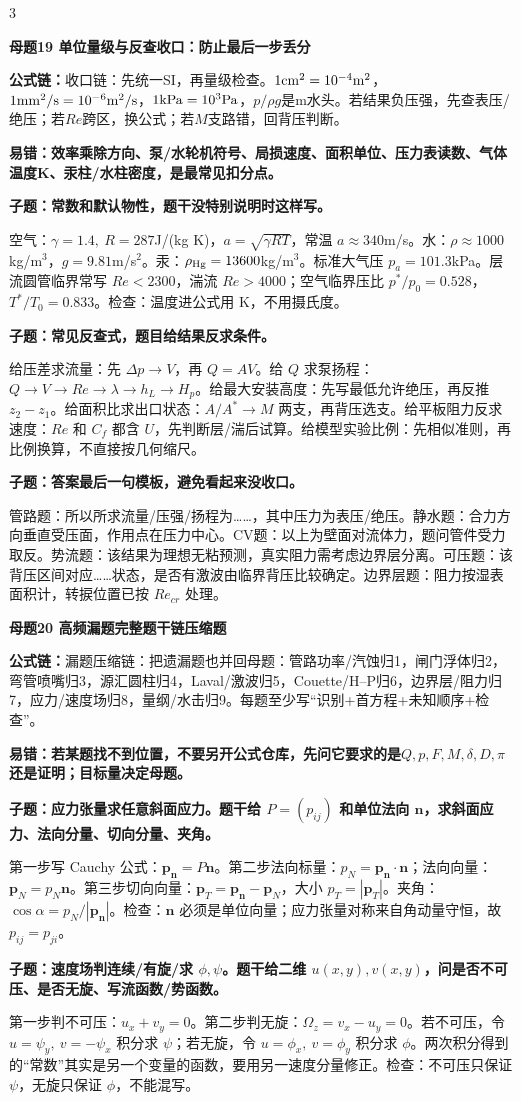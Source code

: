\documentclass[a4paper]{article}
\newcommand{\mt}[1]{\vspace{0.12pt}\colorbox{M}{\parbox{\dimexpr\linewidth-2\fboxsep}{\color{white}\bfseries #1}}\par}
\newcommand{\qt}[1]{\vspace{0.04pt}\colorbox{Q}{\parbox{\dimexpr\linewidth-2\fboxsep}{\color{white}\bfseries #1}}\par}
\newcommand{\ans}[1]{\colorbox{G}{\parbox{\dimexpr\linewidth-2\fboxsep}{#1}}\par}
\newcommand{\warn}[1]{\colorbox{Y}{\parbox{\dimexpr\linewidth-2\fboxsep}{\color{E}\bfseries #1}}\par}
\newcommand{\form}[1]{{\color{M}\bfseries 公式链：}#1\par}
\begin{document}
\begin{multicols}{3}
\mt{母题19 单位量级与反查收口：防止最后一步丢分}
\form{收口链：先统一SI，再量级检查。$1{\rm cm^2}=10^{-4}{\rm m^2}$，$1{\rm mm^2/s}=10^{-6}{\rm m^2/s}$，$1{\rm kPa}=10^3{\rm Pa}$，$p/\rho g$是m水头。若结果负压强，先查表压/绝压；若$Re$跨区，换公式；若$M$支路错，回背压判断。}
\warn{易错：效率乘除方向、泵/水轮机符号、局损速度、面积单位、压力表读数、气体温度K、汞柱/水柱密度，是最常见扣分点。}
\qt{子题：常数和默认物性，题干没特别说明时这样写。}
\ans{空气：$\gamma=1.4,\ R=287$J/(kg K)，$a=\sqrt{\gamma RT}$，常温 $a\approx340$m/s。水：$\rho\approx1000$kg/m$^3$，$g=9.81$m/s$^2$。汞：$\rho_{\rm Hg}=13600$kg/m$^3$。标准大气压 $p_a=101.3$kPa。层流圆管临界常写 $Re<2300$，湍流 $Re>4000$；空气临界压比 $p^*/p_0=0.528$，$T^*/T_0=0.833$。检查：温度进公式用 K，不用摄氏度。}
\qt{子题：常见反查式，题目给结果反求条件。}
\ans{给压差求流量：先 $\Delta p\to V$，再 $Q=AV$。给 $Q$ 求泵扬程：$Q\to V\to Re\to\lambda\to h_L\to H_p$。给最大安装高度：先写最低允许绝压，再反推 $z_2-z_1$。给面积比求出口状态：$A/A^*\to M$ 两支，再背压选支。给平板阻力反求速度：$Re$ 和 $C_f$ 都含 $U$，先判断层/湍后试算。给模型实验比例：先相似准则，再比例换算，不直接按几何缩尺。}
\qt{子题：答案最后一句模板，避免看起来没收口。}
\ans{管路题：所以所求流量/压强/扬程为……，其中压力为表压/绝压。静水题：合力方向垂直受压面，作用点在压力中心。CV题：以上为壁面对流体力，题问管件受力取反。势流题：该结果为理想无粘预测，真实阻力需考虑边界层分离。可压题：该背压区间对应……状态，是否有激波由临界背压比较确定。边界层题：阻力按湿表面积计，转捩位置已按 $Re_{cr}$ 处理。}
\mt{母题20 高频漏题完整题干链压缩题}
\form{漏题压缩链：把遗漏题也并回母题：管路功率/汽蚀归1，闸门浮体归2，弯管喷嘴归3，源汇圆柱归4，Laval/激波归5，Couette/H--P归6，边界层/阻力归7，应力/速度场归8，量纲/水击归9。每题至少写“识别+首方程+未知顺序+检查”。}
\warn{易错：若某题找不到位置，不要另开公式仓库，先问它要求的是$Q,p,F,M,\delta,D,\pi$还是证明；目标量决定母题。}
\qt{子题：应力张量求任意斜面应力。题干给 $P=(p_{ij})$ 和单位法向 $\bm n$，求斜面应力、法向分量、切向分量、夹角。}
\ans{第一步写 Cauchy 公式：$\bm p_{\bm n}=P\bm n$。第二步法向标量：$p_N=\bm p_{\bm n}\cdot\bm n$；法向向量：$\bm p_N=p_N\bm n$。第三步切向向量：$\bm p_T=\bm p_{\bm n}-\bm p_N$，大小 $p_T=|\bm p_T|$。夹角：$\cos\alpha=p_N/|\bm p_{\bm n}|$。检查：$\bm n$ 必须是单位向量；应力张量对称来自角动量守恒，故 $p_{ij}=p_{ji}$。}
\qt{子题：速度场判连续/有旋/求 $\phi,\psi$。题干给二维 $u(x,y),v(x,y)$，问是否不可压、是否无旋、写流函数/势函数。}
\ans{第一步判不可压：$u_x+v_y=0$。第二步判无旋：$\Omega_z=v_x-u_y=0$。若不可压，令 $u=\psi_y,\ v=-\psi_x$ 积分求 $\psi$；若无旋，令 $u=\phi_x,\ v=\phi_y$ 积分求 $\phi$。两次积分得到的“常数”其实是另一个变量的函数，要用另一速度分量修正。检查：不可压只保证 $\psi$，无旋只保证 $\phi$，不能混写。}

\end{multicols}
\end{document}
